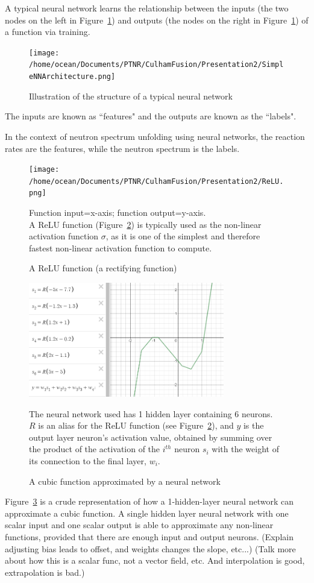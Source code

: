 \documentclass[a4paper, 12pt]{article}
\begin{document}
A typical neural network learns the relationship between the inputs (the two nodes on the left in Figure~\ref{SimpleNNArchitecture}) and outputs (the nodes on the right in Figure~\ref{SimpleNNArchitecture}) of a function via training. 
\begin{figure}
    \centering
    \texttt{[image: /home/ocean/Documents/PTNR/CulhamFusion/Presentation2/SimpleNNArchitecture.png]}
    \caption{Illustration of the structure of a typical neural network} \label{SimpleNNArchitecture}
\end{figure}
The inputs are known as ``features" and the outputs are known as the ``labels".

In the context of neutron spectrum unfolding using neural networks, the reaction rates are the features, while the neutron spectrum is the labels. 

\begin{figure}
    \centering
    \texttt{[image: /home/ocean/Documents/PTNR/CulhamFusion/Presentation2/ReLU.png]}
    \caption{A ReLU function (a rectifying function)}\label{ReLU}
    Function input=x-axis; function output=y-axis.\\
    A ReLU function (Figure~\ref{ReLU}) is typically used as the non-linear activation function $\sigma$, as it is one of the simplest and therefore fastest non-linear activation function to compute.
\end{figure}

\begin{figure}
    \centering
        \includegraphics[height=5cm]{PPT/UniversalApproximationTheorem.png}
        \caption{A cubic function approximated by a neural network}\label{UniversalApproximationTheorem}
    The neural network used has 1 hidden layer containing 6 neurons.\\
    $R$ is an alias for the ReLU function (see Figure~\ref{ReLU}), and $y$ is the output layer neuron's activation value, obtained by summing over the product of the activation of the $i^{th}$ neuron $s_i$ with the weight of its connection to the final layer, $w_i$.
\end{figure}
Figure~\ref{UniversalApproximationTheorem} is a crude representation of how a 1-hidden-layer neural network can approximate a cubic function. A single hidden layer neural network with one scalar input and one scalar output is able to approximate any non-linear functions, provided that there are enough input and output neurons.
(Explain adjusting bias leads to offset, and weights changes the slope, etc...)
(Talk more about how this is a scalar func, not a vector field, etc. And interpolation is good, extrapolation is bad.)
\end{document}
